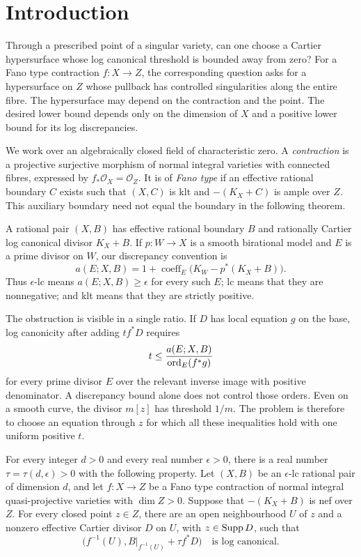 \section*{Introduction}

Through a prescribed point of a singular variety, can one choose a Cartier hypersurface whose log canonical threshold is bounded away from zero? For a Fano type contraction $f:X\to Z$, the corresponding question asks for a hypersurface on $Z$ whose pullback has controlled singularities along the entire fibre. The hypersurface may depend on the contraction and the point. The desired lower bound depends only on the dimension of $X$ and a positive lower bound for its log discrepancies.

We work over an algebraically closed field of characteristic zero. A \emph{contraction} is a projective surjective morphism of normal integral varieties with connected fibres, expressed by $f_*\mathcal O_X=\mathcal O_Z$. It is of \emph{Fano type} if an effective rational boundary $C$ exists such that $(X,C)$ is klt and $-(K_X+C)$ is ample over $Z$. This auxiliary boundary need not equal the boundary in the following theorem.

A rational pair $(X,B)$ has effective rational boundary $B$ and rationally Cartier log canonical divisor $K_X+B$. If $p:W\to X$ is a smooth birational model and $E$ is a prime divisor on $W$, our discrepancy convention is
\[
a(E;X,B)=1+\operatorname{coeff}_E\bigl(K_W-p^*(K_X+B)\bigr).
\]
Thus $\epsilon$-lc means $a(E;X,B)\geq\epsilon$ for every such $E$; lc means that they are nonnegative; and klt means that they are strictly positive.

The obstruction is visible in a single ratio. If $D$ has local equation $g$ on the base, log canonicity after adding $t f^*D$ requires
\[
 t\le\frac{a(E;X,B)}{\operatorname{ord}_E(f^*g)}
\]
for every prime divisor $E$ over the relevant inverse image with positive denominator. A discrepancy bound alone does not control those orders. Even on a smooth curve, the divisor $m[z]$ has threshold $1/m$. The problem is therefore to choose an equation through $z$ for which all these inequalities hold with one uniform positive $t$.

\begin{samepage}
\begin{maintheorem}\label{thm:main}
For every integer $d>0$ and every real number $\epsilon>0$, there is a real number $\tau=\tau(d,\epsilon)>0$ with the following property. Let $(X,B)$ be an $\epsilon$-lc rational pair of dimension $d$, and let $f:X\to Z$ be a Fano type contraction of normal integral quasi-projective varieties with $\dim Z>0$. Suppose that $-(K_X+B)$ is nef over $Z$. For every closed point $z\in Z$, there are an open neighbourhood $U$ of $z$ and a nonzero effective Cartier divisor $D$ on $U$, with $z\in\operatorname{Supp} D$, such that
\[
\bigl(f^{-1}(U),B|_{f^{-1}(U)}+\tau f^*D\bigr)
\quad\text{is log canonical.}
\]
\end{maintheorem}
\end{samepage}

